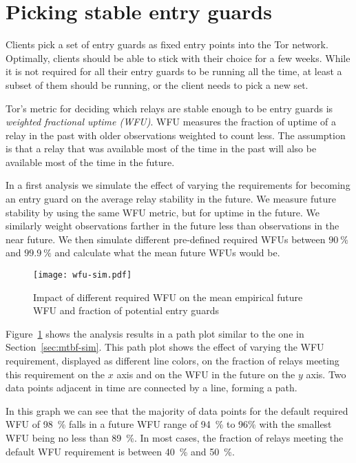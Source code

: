 \documentclass{article}
\begin{document}
\section{Picking stable entry guards}

Clients pick a set of entry guards as fixed entry points into the Tor
network.
Optimally, clients should be able to stick with their choice for a few
weeks.
While it is not required for all their entry guards to be running all the
time, at least a subset of them should be running, or the client needs to
pick a new set.

Tor's metric for deciding which relays are stable enough to be entry
guards is \emph{weighted fractional uptime (WFU)}.
WFU measures the fraction of uptime of a relay in the past with older
observations weighted to count less.
The assumption is that a relay that was available most of the time in the
past will also be available most of the time in the future.

In a first analysis we simulate the effect of varying the requirements for
becoming an entry guard on the average relay stability in the future.
We measure future stability by using the same WFU metric, but for uptime
in the future.
We similarly weight observations farther in the future less than
observations in the near future.
We then simulate different pre-defined required WFUs between $90~\%$ and
$99.9~\%$ and calculate what the mean future WFUs would be.

\begin{figure}[t]
\texttt{[image: wfu-sim.pdf]}
\caption{Impact of different required WFU on the mean empirical future WFU
and fraction of potential entry guards}
\label{fig:wfu-sim}
\end{figure}

Figure~\ref{fig:wfu-sim} shows the analysis results in a path plot similar
to the one in Section~\ref{sec:mtbf-sim}.
This path plot shows the effect of varying the WFU requirement, displayed
as different line colors, on the fraction of relays meeting this
requirement on the $x$ axis and on the WFU in the future on the $y$ axis.
Two data points adjacent in time are connected by a line, forming a path.

In this graph we can see that the majority of data points for the default
required WFU of 98~\% falls in a future WFU range of 94~\% to 96\% with
the smallest WFU being no less than 89~\%.
In most cases, the fraction of relays meeting the default WFU requirement
is between 40~\% and 50~\%.
\end{document}
